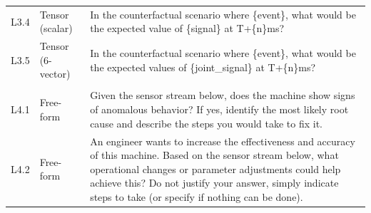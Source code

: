 \documentclass{article}
\begin{document}
\begin{small}
\begin{longtable}{@{}>{\centering\arraybackslash}p{}>{\raggedright\arraybackslash}p{}>{\raggedright\arraybackslash}p{}@{}}
        L3.4        & Tensor (scalar)        & In the counterfactual scenario where \{event\}, what would be the expected value of \{signal\} at T+\{n\}ms?                                                                                                                                                                                                                                                                                                                                                                                       \\
        L3.5        & Tensor (6-vector)      & In the counterfactual scenario where \{event\}, what would be the expected values of \{joint\_signal\} at T+\{n\}ms?                                                                                                                                                                                                                                                                                                                                                                               \\
        \midrule

        \multicolumn{3}{@{}l@{}}{\textbf{Level 4: Decision}}                                                                                                                                                                                                                                                                                                                                                                                                                                                                                      \\
        \midrule
        L4.1        & Free-form              & Given the sensor stream below, does the machine show signs of anomalous behavior? If yes, identify the most likely root cause and describe the steps you would take to fix it.                                                                                                                                                                                                                                                                                                                     \\
        L4.2        & Free-form              & An engineer wants to increase the effectiveness and accuracy of this machine. Based on the sensor stream below, what operational changes or parameter adjustments could help achieve this? Do not justify your answer, simply indicate steps to take (or specify if nothing can be done).                                                                                                                                                                                                          \\
    \end{longtable}
\end{small}
\end{document}

